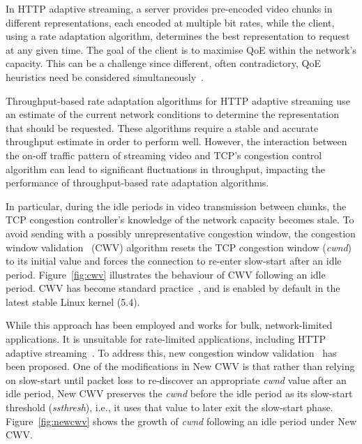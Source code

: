 \documentclass[10pt,sigconf,anonymous]{acmart}
\begin{document}
In HTTP adaptive streaming, a server provides pre-encoded video chunks in different representations, each encoded at multiple bit rates, while the client, using a rate adaptation algorithm, determines the best representation to request at any given time. The goal of the client is to maximise QoE within the network's capacity. This can be a challenge since different, often contradictory, QoE heuristics need be considered simultaneously~\cite{Seufert-2015-A-Survey-on-QoE-Dash}. 

Throughput-based rate adaptation algorithms for HTTP adaptive streaming use an estimate of the current network conditions to determine the representation that should be requested. These algorithms require a stable and accurate throughput estimate in order to perform well. However, the interaction between the on-off traffic pattern of streaming video and TCP's congestion control algorithm can lead to significant fluctuations in throughput, impacting the performance of throughput-based rate adaptation algorithms.


In particular, during the idle periods in video transmission between chunks, the TCP congestion controller's knowledge of the network capacity becomes stale. To avoid sending with a possibly unrepresentative congestion window, the congestion window validation~\cite{rfc2861-2000-padhye-congestion-window-validation} (CWV) algorithm resets the TCP congestion window (\emph{cwnd}) to its initial value and forces the connection to re-enter slow-start after an idle period. Figure~\ref{fig:cwv} illustrates the behaviour of CWV following an idle period. CWV has become standard practice~\cite{rfc5681-congeston-control}, and is enabled by default in the latest stable Linux kernel (5.4).

While this approach has been employed and works for bulk, network-limited applications. It is unsuitable for rate-limited applications, including HTTP adaptive streaming~\cite{Esteban-2012-Interactions-HTTP-TCP}. To address this, new congestion window validation~\cite{rfc7661-2015-fairhurst-new-cwnd-validation} has been proposed. One of the modifications in New CWV is that rather than relying on slow-start until packet loss to re-discover an appropriate \emph{cwnd} value after an idle period, New CWV preserves the \emph{cwnd} before the idle period as its slow-start threshold (\emph{ssthresh}), i.e., it uses that value to later exit the slow-start phase. Figure~\ref{fig:newcwv} shows the growth of \emph{cwnd} following an idle period under New CWV.
\end{document}
